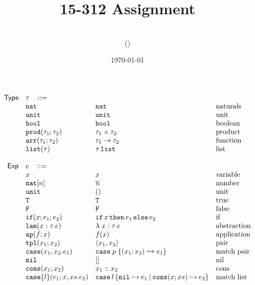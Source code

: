 \documentclass[11pt]{article}
\title{15-312 Assignment \hwnumber}
\author{\myname\\(\myandrewid)}
\date{\today}
\newcommand{\ms}[1]{\ensuremath{\mathsf{#1}}}
\newcommand{\irl}[1]{\mathtt{#1}}
\newcommand{\paircaseabt}[4]{\irl{case}(#2,#3.#4)}
\newcommand{\paircasecst}[4]{\irl{case} \; #1\; \{(#2;#3) \hookrightarrow #4\}}
\begin{document}
\maketitle

\[
\begin{array}{r l l l l}
\ms{Type} & \tau \,\,\,\,\, ::= \\
	& \irl{nat}                	 			& \irl{nat}											& \text{naturals}\\
	& \unittyabt                	 			& \unittycst										& \text{unit}\\
  & \booltyabt                       & \booltycst                    & \text{boolean}\\
  & \prodtyabt{\tau_1}{\tau_2}       & \prodtycst{\tau_1}{\tau_2}    & \text{product}\\
	&\irl{arr}(\tau_1;\tau_2) 				& \arrtycst{\tau_1}{\tau_2} 									& \text{function}\\
  &\listtyabt{\tau}		& \listtycst{\tau}											& \text{list}\\
	 \\
\ms{Exp}
        & e   \,\,\,\,\, ::= \\
 	& x                                			& x 												& \text{variable}\\
  & \irl{nat}[n]							& \numeral{n}												& \text{number}\\
  & \irl{unit}							& ()												& \text{unit}\\
  & \irl{T}							& \irl{T}												& \text{true}\\
  & \irl{F}	   					& \irl{F}												& \text{false}\\
  & \ifexabt{x}{e_1}{e_2} & \ifexcst{x}{e_1}{e_2}  & \text{if}\\
  & \irl{lam}(x:\tau.e) 						&\lambda \; x : \tau. e 		& \text{abstraction}\\
  & \irl{ap}(f;x) 					& \appcst{f}{x} 										& \text{application}\\
  & \irl{tpl}(x_1;x_2)     	& \pairexcst{x_1}{x_2}                									& \text{pair}\\
 	& \paircaseabt{p}{x_1}{x_2}{e_1}					& \paircasecst{p}{x_1}{x_2}{e_1}   	& \text{match pair}\\
 	& \nilexabt					& []   										& \text{nil}\\
 	& \consexabt{x_1}{x_2}					& x_1::x_2   										& \text{cons}\\
 	& \listcaseexabt{l}{e_1}{x}{xs}{e_2}					& \listcaseexcst{l}{e_1}{x}{xs}{e_2}   	& \text{match list}\\

\end{array}\]
\end{document}
